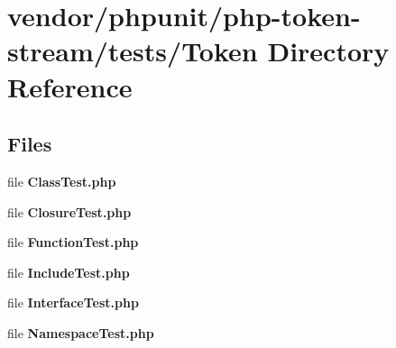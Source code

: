 \section{vendor/phpunit/php-\/token-\/stream/tests/\+Token Directory Reference}
\label{dir_e04e159d96404bb1f1c528467fff58a0}
\subsection*{Files}
\begin{DoxyCompactItemize}
\item 
file {\bf Class\+Test.\+php}
\item 
file {\bf Closure\+Test.\+php}
\item 
file {\bf Function\+Test.\+php}
\item 
file {\bf Include\+Test.\+php}
\item 
file {\bf Interface\+Test.\+php}
\item 
file {\bf Namespace\+Test.\+php}
\end{DoxyCompactItemize}
